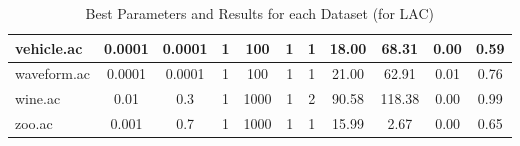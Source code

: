 \begin{table}[htbp]
\begin{tabular}{|l|c|c|c|c|c|c||c|c|c|c|}
		\hline
		vehicle.ac     & 0.0001   & 0.0001      & 1              & 100                 & 1             & 1             & 18.00          & 68.31          & 0.00           & 0.59           \\
		\hline
		waveform.ac    & 0.0001   & 0.0001      & 1              & 100                 & 1             & 1             & 21.00          & 62.91          & 0.01           & 0.76           \\
		\hline
		wine.ac        & 0.01     & 0.3         & 1              & 1000                & 1             & 2             & 90.58          & 118.38         & 0.00           & 0.99           \\
		\hline
		zoo.ac         & 0.001    & 0.7         & 1              & 1000                & 1             & 1             & 15.99          & 2.67           & 0.00           & 0.65           \\
		\hline
		\end{tabular}
	\caption{Best Parameters and Results for each Dataset (for LAC)}
	\label{tab:best_runs_for_each_db_lac}
\end{table}